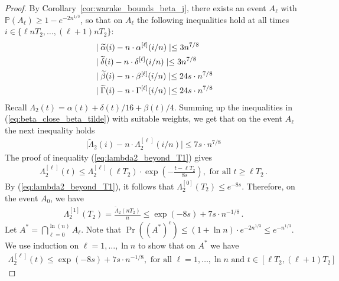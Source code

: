 \documentclass[a4paper,12pt]{article}
\begin{document}
\begin{proof}
By Corollary~\ref{cor:warnke_bounds_beta_j}, there exists an event $A_{\ell}$ with $\mathbb{P}(A_{\ell}) \geq 1 - e^{-2n^{1/3}}$, so that on $A_{\ell}$ the following inequalities hold at all times $i \in \{\ell nT_2, \ldots, (\ell +1)nT_2\}$:
\begin{align} \label{eq:beta_close_beta_tilde}
& \mid \widetilde{\alpha}(i) - n \cdot \alpha^{[\ell]}(i/n) \mid \leq 3 n^{7/8} \notag \\
& \mid \widetilde{\delta}(i) - n \cdot \delta^{[\ell]}(i/n) \mid \leq 3 n^{7/8} \notag \\
& \mid \widetilde{\beta}(i) - n \cdot \beta^{[\ell]}(i/n) \mid \leq 24s \cdot n^{7/8} \notag \\
& \mid \widetilde{\Gamma}(i) - n \cdot \Gamma^{[\ell]}(i/n) \mid \leq 24s \cdot n^{7/8}
\end{align}
Recall $\Lambda_2(t) = \alpha(t) + \delta(t)/16 + \beta(t)/4$.
Summing up the inequalities in (\ref{eq:beta_close_beta_tilde}) with suitable weights, we get that on the event $A_{\ell}$ the next inequality holds
\begin{align} \label{eq:tilde_lambda_deterministic_interval_bound}
\mid \widetilde{\Lambda}_2(i) - n \cdot \Lambda_2^{[\ell]}(i/n) \mid \leq 7s \cdot n^{7/8}
\end{align}
The proof of inequality (\ref{eq:lambda2_beyond_T1}) gives
\begin{align} \label{eq:lambda2_beyond_T1_kth_system}
\Lambda_{2}^{[\ell]}(t) \leq \Lambda_{2}^{[\ell ]}(\ell T_2) \cdot \exp\left(-\frac{t - \ell T_2}{8s}\right), \mbox{ for all } t \geq \ell T_2\,.
\end{align}
By (\ref{eq:lambda2_beyond_T1}), it follows that $\Lambda_{2}^{[0]}(T_2) \leq e^{-8s}$. Therefore, on the event $A_0$, we have
\begin{align} \label{eq:lambda2_base_case_k=1}
\Lambda_{2}^{[1]}(T_2) = \frac{\widetilde{\Lambda}_2(nT_2)}{n} \leq \exp(-8s) + 7s \cdot n^{-1/8}\,.
\end{align}
Let $A^* = \bigcap_{\ell =0}^{\ln(n)} A_{\ell }$. Note that $\Pr((A^*)^c) \leq (1 + \ln{n}) \cdot e^{-2n^{1/3}} \leq e^{-n^{1/3}}$.
We use induction on $\ell  = 1, \ldots, \ln{n}$ to show that on $A^*$ we have
\begin{align} \label{eq:lambda2_k_induction_bound}
\Lambda_2^{[\ell ]}(t) \leq \exp(-8s) + 7s \cdot n^{-1/8}, \mbox{ for all } \ell  = 1, \ldots, \ln{n} \mbox{ and } t \in [\ell T_2, (\ell +1)T_2]
\end{align}%

\end{proof}
\end{document}
